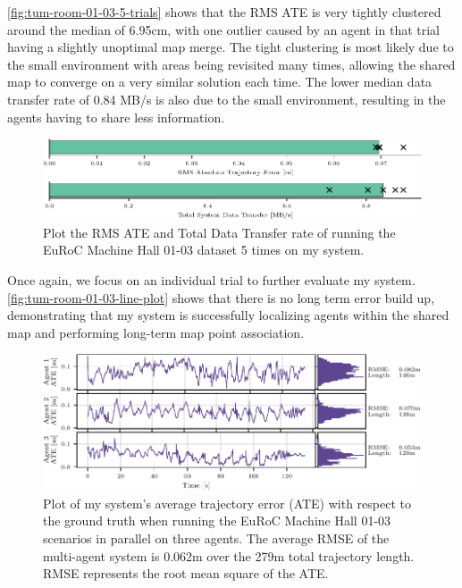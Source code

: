 \autoref{fig:tum-room-01-03-5-trials} shows that the RMS ATE is very tightly clustered around the median of 6.95cm, with one outlier caused by an agent in that trial having a slightly unoptimal map merge. The tight clustering is most likely due to the small environment with areas being revisited many times, allowing the shared map to converge on a very similar solution each time. The lower median data transfer rate of 0.84 MB/s is also due to the small environment, resulting in the agents having to share less information.

\begin{figure}[h]
    \centering
    \includegraphics[width=\linewidth]{figures/comparison_apr11_tum_room_trajectory_a.pdf}

    \caption{Plot the RMS ATE and Total Data Transfer rate of running the EuRoC Machine Hall 01-03 dataset 5 times on my system.}
    \label{fig:tum-room-01-03-5-trials}
\end{figure}

Once again, we focus on an individual trial to further evaluate my system. \autoref{fig:tum-room-01-03-line-plot} shows that there is no long term error build up, demonstrating that my system is successfully localizing agents within the shared map and performing long-term map point association.

\begin{figure}[h]
    \centering
    \includegraphics[width=\linewidth]{figures/apr11_tum_room_trajectory_a_line_plot.pdf}

    \caption{Plot of my system's average trajectory error (ATE) with respect to the ground truth when running the EuRoC Machine Hall 01-03 scenarios in parallel on three agents. The average RMSE of the multi-agent system is 0.062m over the 279m total trajectory length. \captionbreak RMSE represents the root mean square of the ATE.}
    \label{fig:tum-room-01-03-line-plot}
\end{figure}

